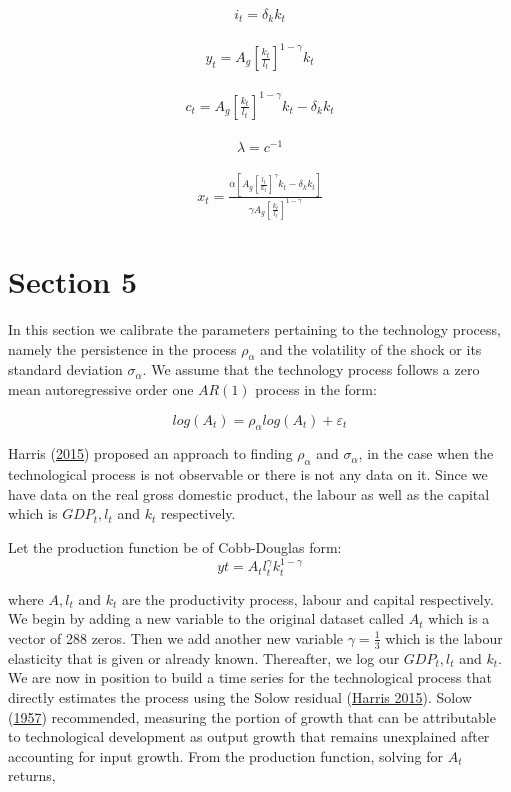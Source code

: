 \documentclass[
  11pt,
  justified]{article}
\begin{document}
\begin{align}
i_t = \delta_k k_t \tag{Investment} 
\end{align}

\begin{align}
y_t = A_g [\frac{k_t}{l_t}]^{1-\gamma} k_t \tag{Output}
\end{align}

\begin{align}
c_t = A_g [\frac{k_t}{l_t}]^{1-\gamma} k_t - \delta_k k_t \tag{Consumption}
\end{align}

\begin{align}
\lambda = c^{-1} \tag{Marginal utility of consumption} 
\end{align}

\begin{align}
x_t = \frac{\alpha [A_g [\frac{l_t}{k_t}]^{\gamma} k_t - \delta_k k_t]}{ \gamma A_g [\frac{k_t}{l_t}]^{1- \gamma}} \tag{Leisure}
\end{align}

\hypertarget{section-5}{%
\section{Section 5}\label{section-5}}

In this section we calibrate the parameters pertaining to the technology
process, namely the persistence in the process \(\rho_{\alpha}\) and the
volatility of the shock or its standard deviation \(\sigma_\alpha\). We
assume that the technology process follows a zero mean autoregressive
order one \(AR(1)\) process in the form:

\[ log(A_t) = \rho_{\alpha}log(A_t) + \varepsilon _t\]

Harris (\protect\hyperlink{ref-harris2015}{2015}) proposed an approach
to finding \(\rho_{\alpha}\) and \(\sigma_\alpha\), in the case when the
technological process is not observable or there is not any data on it.
Since we have data on the real gross domestic product, the labour as
well as the capital which is \(GDP_t, l_t\) and \(k_t\) respectively.

Let the production function be of Cobb-Douglas form: \[
yt = A_t l_t^\gamma k_t^{1-\gamma}
\]

where \(A, l_t\) and \(k_t\) are the productivity process, labour and
capital respectively. We begin by adding a new variable to the original
dataset called \(A_t\) which is a vector of 288 zeros. Then we add
another new variable \(\gamma = \frac{1}{3}\) which is the labour
elasticity that is given or already known. Thereafter, we log our
\(GDP_t, l_t\) and \(k_t\). We are now in position to build a time
series for the technological process that directly estimates the process
using the Solow residual (\protect\hyperlink{ref-harris2015}{Harris
2015}). Solow (\protect\hyperlink{ref-solow1957technical}{1957})
recommended, measuring the portion of growth that can be attributable to
technological development as output growth that remains unexplained
after accounting for input growth. From the production function, solving
for \(A_t\) returns,
\end{document}
